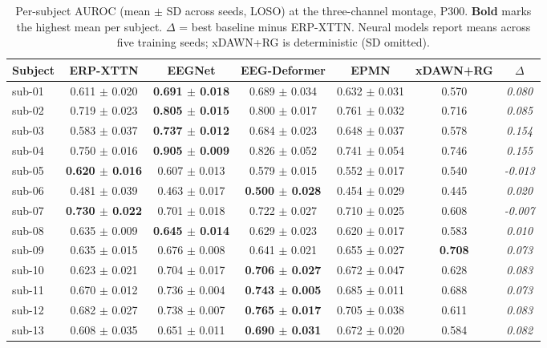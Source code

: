 \begin{table}[t]
\centering
\caption{Per-subject AUROC (mean $\pm$ SD across seeds, LOSO) at the three-channel montage, P300. \textbf{Bold} marks the highest mean per subject. $\Delta$ = best baseline minus ERP-XTTN. Neural models report means across five training seeds; xDAWN+RG is deterministic (SD omitted).}
\label{sup:tab-persubj-p300}
\begin{tabular}{lcccccc}
\toprule
Subject & ERP-XTTN & EEGNet & EEG-Deformer & EPMN & xDAWN+RG & $\Delta$ \\
\midrule
sub-01 & 0.611 $\pm$ 0.020 & \textbf{0.691 $\pm$ 0.018} & 0.689 $\pm$ 0.034 & 0.632 $\pm$ 0.031 & 0.570 & \textit{0.080} \\
sub-02 & 0.719 $\pm$ 0.023 & \textbf{0.805 $\pm$ 0.015} & 0.800 $\pm$ 0.017 & 0.761 $\pm$ 0.032 & 0.716 & \textit{0.085} \\
sub-03 & 0.583 $\pm$ 0.037 & \textbf{0.737 $\pm$ 0.012} & 0.684 $\pm$ 0.023 & 0.648 $\pm$ 0.037 & 0.578 & \textit{0.154} \\
sub-04 & 0.750 $\pm$ 0.016 & \textbf{0.905 $\pm$ 0.009} & 0.826 $\pm$ 0.052 & 0.741 $\pm$ 0.054 & 0.746 & \textit{0.155} \\
sub-05 & \textbf{0.620 $\pm$ 0.016} & 0.607 $\pm$ 0.013 & 0.579 $\pm$ 0.015 & 0.552 $\pm$ 0.017 & 0.540 & \textit{-0.013} \\
sub-06 & 0.481 $\pm$ 0.039 & 0.463 $\pm$ 0.017 & \textbf{0.500 $\pm$ 0.028} & 0.454 $\pm$ 0.029 & 0.445 & \textit{0.020} \\
sub-07 & \textbf{0.730 $\pm$ 0.022} & 0.701 $\pm$ 0.018 & 0.722 $\pm$ 0.027 & 0.710 $\pm$ 0.025 & 0.608 & \textit{-0.007} \\
sub-08 & 0.635 $\pm$ 0.009 & \textbf{0.645 $\pm$ 0.014} & 0.629 $\pm$ 0.023 & 0.620 $\pm$ 0.017 & 0.583 & \textit{0.010} \\
sub-09 & 0.635 $\pm$ 0.015 & 0.676 $\pm$ 0.008 & 0.641 $\pm$ 0.021 & 0.655 $\pm$ 0.027 & \textbf{0.708} & \textit{0.073} \\
sub-10 & 0.623 $\pm$ 0.021 & 0.704 $\pm$ 0.017 & \textbf{0.706 $\pm$ 0.027} & 0.672 $\pm$ 0.047 & 0.628 & \textit{0.083} \\
sub-11 & 0.670 $\pm$ 0.012 & 0.736 $\pm$ 0.004 & \textbf{0.743 $\pm$ 0.005} & 0.685 $\pm$ 0.011 & 0.688 & \textit{0.073} \\
sub-12 & 0.682 $\pm$ 0.027 & 0.738 $\pm$ 0.007 & \textbf{0.765 $\pm$ 0.017} & 0.705 $\pm$ 0.038 & 0.611 & \textit{0.083} \\
sub-13 & 0.608 $\pm$ 0.035 & 0.651 $\pm$ 0.011 & \textbf{0.690 $\pm$ 0.031} & 0.672 $\pm$ 0.020 & 0.584 & \textit{0.082} \\

\end{tabular}
\end{table}
